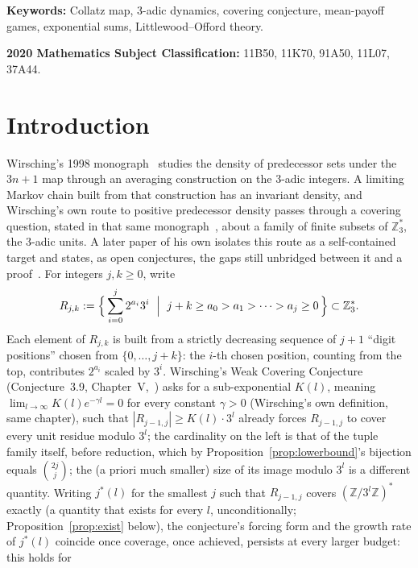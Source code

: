 \documentclass[11pt]{amsart}
\theoremstyle{plain}
\theoremstyle{definition}
\theoremstyle{remark}
\newcommand{\Z}{\mathbb{Z}}
\begin{document}
\noindent\textbf{Keywords:} Collatz map, 3-adic dynamics, covering conjecture, mean-payoff games,
exponential sums, Littlewood--Offord theory.

\noindent\textbf{2020 Mathematics Subject Classification:} 11B50, 11K70, 91A50, 11L07, 37A44.

\section{Introduction}
\label{sec:intro}

Wirsching's 1998 monograph~\cite{wirsching1998} studies the density of predecessor sets under the
$3n+1$ map through an averaging construction on the $3$-adic integers. A limiting Markov chain
built from that construction has an invariant density, and Wirsching's own route to positive
predecessor density passes through a covering question, stated in that same
monograph~\cite{wirsching1998}, about a family of finite subsets of $\Z_3^*$, the $3$-adic units. A
later paper of his own isolates this route as a self-contained target and states, as open
conjectures, the gaps still unbridged between it and a proof~\cite{wirsching2003}. For integers
$j,k\ge0$, write
\begin{equation}
\label{eq:Rjk}
R_{j,k} := \Bigl\{\, \sum_{i=0}^{j} 2^{a_i}3^i \ \Bigm|\ j+k \ge a_0 > a_1 > \cdots > a_j \ge 0
\,\Bigr\} \subset \Z_3^*.
\end{equation}
Each element of $R_{j,k}$ is built from a strictly decreasing sequence of $j+1$ ``digit positions''
chosen from $\{0,\dots,j+k\}$: the $i$-th chosen position, counting from the top, contributes
$2^{a_i}$ scaled by $3^i$. Wirsching's Weak Covering Conjecture (Conjecture~3.9,
Chapter~V,~\cite{wirsching1998}) asks for a sub-exponential $K(l)$, meaning $\lim_{l\to\infty}
K(l)e^{-\gamma l}=0$ for every constant $\gamma>0$ (Wirsching's own definition, same chapter), such
that $|R_{j-1,j}| \ge K(l)\cdot 3^l$
already forces $R_{j-1,j}$ to cover every unit residue modulo $3^l$; the cardinality on the left is
that of the tuple family itself, before reduction, which by
Proposition~\ref{prop:lowerbound}'s bijection equals $\binom{2j}{j}$; the (a priori much smaller)
size of its image modulo $3^l$ is a different quantity. Writing $j^*(l)$ for the smallest $j$ such
that
$R_{j-1,j}$ covers $(\Z/3^l\Z)^*$ exactly (a quantity that exists for every $l$, unconditionally;
Proposition~\ref{prop:exist} below), the conjecture's forcing form and the growth rate of
$j^*(l)$ coincide once coverage, once achieved, persists at every larger budget: this holds for
\end{document}
